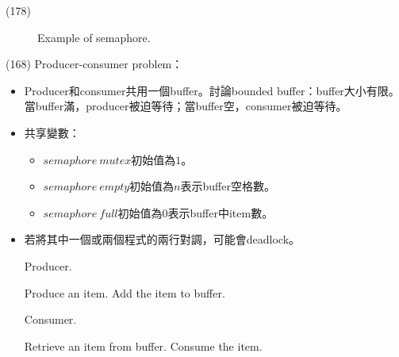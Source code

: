 \begin{theorem}{(178)}
\begin{itemize}
\begin{figure}[H]
            \caption{Example of semaphore.}
            \label{img:ex_semaphore}
        \end{figure}
    \end{itemize}
\end{theorem}

\begin{theorem}{(168)} Producer-consumer problem：\begin{itemize}
        \item Producer和consumer共用一個buffer。討論bounded buffer：buffer大小有限。當buffer滿，producer被迫等待；當buffer空，consumer被迫等待。
        \item 共享變數：\begin{itemize}
            \item $semaphore \ mutex$初始值為$1$。
            \item $semaphore \ empty$初始值為$n$表示buffer空格數。
            \item $semaphore \ full$初始值為$0$表示buffer中item數。
        \end{itemize}
        \item 若將其中一個或兩個程式的兩行對調，可能會deadlock。
        \begin{algorithm}[H]
            \caption{Producer.}
            \begin{algorithmic}[1]
                    \Repeat
                        \State Produce an item.
                        \State {}
                        \State {}
                        \State Add the item to buffer.
                        \State {}
                        \State {}
                \EndFunction
            \end{algorithmic}
        \end{algorithm}
        \begin{algorithm}[H]
            \caption{Consumer.}
            \begin{algorithmic}[1]
                    \Repeat
                        \State {}
                        \State {}
                        \State Retrieve an item from buffer.
                        \State {}
                        \State {}
                        \State Consume the item.
                \EndFunction
            \end{algorithmic}
        \end{algorithm}
    \end{itemize}
\end{theorem}

